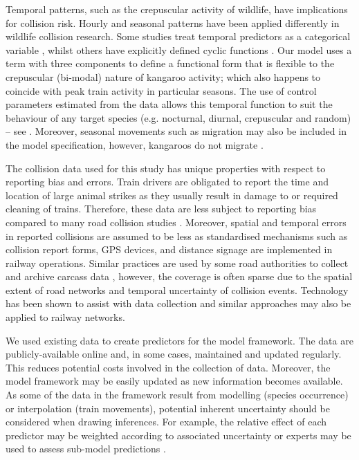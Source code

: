 Temporal patterns, such as the crepuscular activity of wildlife, have implications for collision risk. Hourly and seasonal patterns have been applied differently in wildlife collision research.  Some studies treat temporal predictors as a categorical variable \citep{duss06}, whilst others have explicitly defined cyclic functions \citep{thur15}.  Our model uses a term with three components to define a functional form that is flexible to the crepuscular (bi-modal) nature of kangaroo activity; which also happens to coincide with peak train activity in particular seasons. The use of control parameters estimated from the data allows this temporal function to suit the behaviour of any target species (e.g. nocturnal, diurnal, crepuscular and random) -- see .  Moreover, seasonal movements such as migration \citep[see][]{neum12} may also be included in the model specification, however, kangaroos do not migrate \citep{daws12}.

The collision data used for this study has unique properties with respect to reporting bias and errors.  Train drivers are obligated to report the time and location of large animal strikes as they usually result in damage to or required cleaning of trains.  Therefore, these data are less subject to reporting bias compared to many road collision studies \citep[but see][]{snow15}.  Moreover, spatial and temporal errors in reported collisions are assumed to be less as standardised mechanisms such as collision report forms, GPS devices, and distance signage are implemented in railway operations. Similar practices are used by some road authorities to collect and archive carcass data \citep{huij07a}, however, the coverage is often sparse due to the spatial extent of road networks and temporal uncertainty of collision events.  Technology has been shown to assist with data collection \citep{olso14,shil15b} and similar approaches may also be applied to railway networks.

We used existing data to create predictors for the model framework. The data are publicly-available online and, in some cases, maintained and updated regularly. This reduces potential costs involved in the collection of data. Moreover, the model framework may be easily updated as new information becomes available.  As some of the data in the framework result from modelling (species occurrence) or interpolation (train movements), potential inherent uncertainty should be considered when drawing inferences. For example, the relative effect of each predictor may be weighted according to associated uncertainty or experts may be used to assess sub-model predictions \citep[e.g. species occurrence -- see][]{clev02,wint05}.

